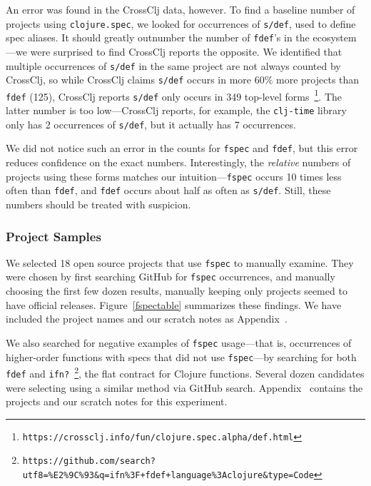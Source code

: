 An error was found in the CrossClj data, however.
To find a baseline number of projects using \texttt{clojure.spec}, we looked for occurrences of
\texttt{s/def}, used to define spec
aliases. It should greatly outnumber the number of \texttt{fdef}'s in the ecosystem---we were
surprised to find CrossClj reports the opposite.
We identified that multiple occurrences of \texttt{s/def} in the same project are not always counted by CrossClj,
so while CrossClj claims \texttt{s/def} occurs in more 60\% more projects than \texttt{fdef} (125), 
CrossClj reports \texttt{s/def} only occurs in 349 top-level 
forms~\footnote{\texttt{https://crossclj.info/fun/clojure.spec.alpha/def.html}}.
The latter number is too low---CrossClj reports, for example, the \texttt{clj-time}
library only has 2 occurrences of \texttt{s/def}, but it actually has 7 occurrences.

We did not notice such an error in the counts for \texttt{fspec} and \texttt{fdef}, but
this error reduces confidence on the exact numbers. Interestingly, the \emph{relative}
numbers of projects using these forms matches our intuition---\texttt{fspec} occurs
10 times less often than \texttt{fdef}, and \texttt{fdef} occurs about half as often as \texttt{s/def}.
Still, these numbers should be treated with suspicion.

\subsubsection{Project Samples}

We selected 18 open source projects that use \texttt{fspec} to manually examine.
They were chosen by first searching GitHub for \texttt{fspec} occurrences, and
manually choosing the first few dozen results, manually keeping only projects
seemed to have official releases.
Figure~\ref{fspectable} summarizes these findings. We have included the project
names and our scratch notes as Appendix~\label{appendix1}.

We also searched for negative examples of \texttt{fspec} usage---that is, occurrences
of higher-order functions with specs that did not use \texttt{fspec}---by searching for
both \texttt{fdef} and 
\texttt{ifn?}~\footnote{\texttt{https://github.com/search?utf8=\%E2\%9C\%93\&q=ifn\%3F+fdef+language\%3Aclojure\&type=Code}}, 
the flat contract for Clojure functions.
Several dozen candidates were selecting using a similar method via GitHub search.
Appendix~\label{appendix2} contains the projects and our scratch notes for this experiment.

